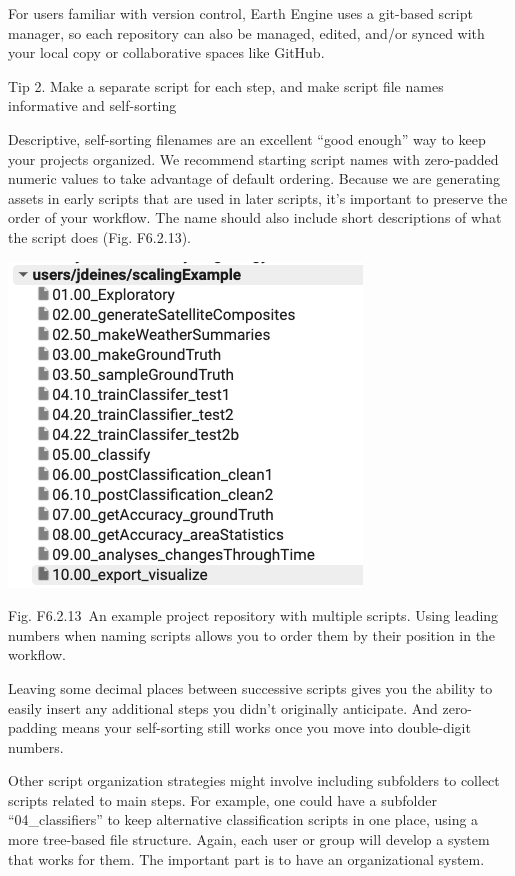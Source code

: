 \documentclass[
  letterpaper,
  DIV=11,
  numbers=noendperiod]{scrreprt}
\begin{document}
For users familiar with version control, Earth Engine uses a git-based
script manager, so each repository can also be managed, edited, and/or
synced with your local copy or collaborative spaces like GitHub.

Tip 2. Make a separate script for each step, and make script file names
informative and self-sorting

Descriptive, self-sorting filenames are an excellent ``good enough'' way
to keep your projects organized. We recommend starting script names with
zero-padded numeric values to take advantage of default ordering.
Because we are generating assets in early scripts that are used in later
scripts, it's important to preserve the order of your workflow. The name
should also include short descriptions of what the script does (Fig.
F6.2.13).

\includegraphics{./F6/image62.png}

Fig. F6.2.13~An example project repository with multiple scripts. Using
leading numbers when naming scripts allows you to order them by their
position in the workflow.

Leaving some decimal places between successive scripts gives you the
ability to easily insert any additional steps you didn't originally
anticipate. And zero-padding means your self-sorting still works once
you move into double-digit numbers.

Other script organization strategies might involve including subfolders
to collect scripts related to main steps. For example, one could have a
subfolder ``04\_classifiers'' to keep alternative classification scripts
in one place, using a more tree-based file structure. Again, each user
or group will develop a system that works for them. The important part
is to have an organizational system.
\end{document}
